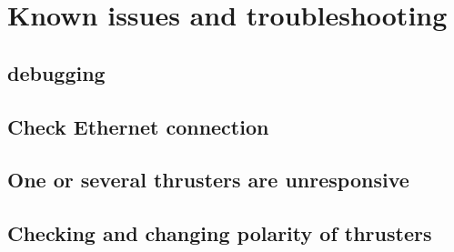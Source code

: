 \section{Known issues and troubleshooting}

\subsection{\abbrROS debugging}

\subsection{Check Ethernet connection}

\subsection{One or several thrusters are unresponsive}

\subsection{Checking and changing polarity of thrusters}
